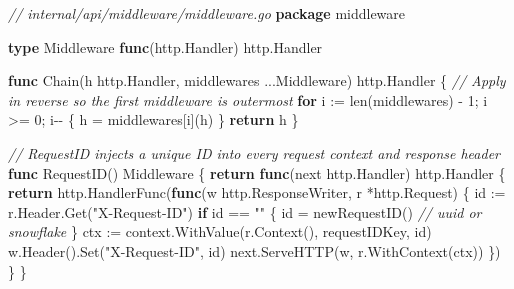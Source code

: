 \documentclass[
]{article}
\newenvironment{Shaded}{}{}
\newcommand{\BuiltInTok}[1]{\textcolor[rgb]{0.00,0.50,0.00}{#1}}
\newcommand{\CommentTok}[1]{\textcolor[rgb]{0.38,0.63,0.69}{\textit{#1}}}
\newcommand{\ControlFlowTok}[1]{\textcolor[rgb]{0.00,0.44,0.13}{\textbf{#1}}}
\newcommand{\DecValTok}[1]{\textcolor[rgb]{0.25,0.63,0.44}{#1}}
\newcommand{\KeywordTok}[1]{\textcolor[rgb]{0.00,0.44,0.13}{\textbf{#1}}}
\newcommand{\NormalTok}[1]{#1}
\newcommand{\OperatorTok}[1]{\textcolor[rgb]{0.40,0.40,0.40}{#1}}
\newcommand{\StringTok}[1]{\textcolor[rgb]{0.25,0.44,0.63}{#1}}
\begin{document}
\begin{Shaded}
\begin{Highlighting}[]
\CommentTok{// internal/api/middleware/middleware.go}
\KeywordTok{package}\NormalTok{ middleware}

\KeywordTok{type}\NormalTok{ Middleware }\KeywordTok{func}\OperatorTok{(}\NormalTok{http}\OperatorTok{.}\NormalTok{Handler}\OperatorTok{)}\NormalTok{ http}\OperatorTok{.}\NormalTok{Handler}

\KeywordTok{func}\NormalTok{ Chain}\OperatorTok{(}\NormalTok{h http}\OperatorTok{.}\NormalTok{Handler}\OperatorTok{,}\NormalTok{ middlewares }\OperatorTok{...}\NormalTok{Middleware}\OperatorTok{)}\NormalTok{ http}\OperatorTok{.}\NormalTok{Handler }\OperatorTok{\{}
    \CommentTok{// Apply in reverse so the first middleware is outermost}
    \ControlFlowTok{for}\NormalTok{ i }\OperatorTok{:=} \BuiltInTok{len}\OperatorTok{(}\NormalTok{middlewares}\OperatorTok{)} \OperatorTok{{-}} \DecValTok{1}\OperatorTok{;}\NormalTok{ i }\OperatorTok{\textgreater{}=} \DecValTok{0}\OperatorTok{;}\NormalTok{ i}\OperatorTok{{-}{-}} \OperatorTok{\{}
\NormalTok{        h }\OperatorTok{=}\NormalTok{ middlewares}\OperatorTok{[}\NormalTok{i}\OperatorTok{](}\NormalTok{h}\OperatorTok{)}
    \OperatorTok{\}}
    \ControlFlowTok{return}\NormalTok{ h}
\OperatorTok{\}}

\CommentTok{// RequestID injects a unique ID into every request context and response header}
\KeywordTok{func}\NormalTok{ RequestID}\OperatorTok{()}\NormalTok{ Middleware }\OperatorTok{\{}
    \ControlFlowTok{return} \KeywordTok{func}\OperatorTok{(}\NormalTok{next http}\OperatorTok{.}\NormalTok{Handler}\OperatorTok{)}\NormalTok{ http}\OperatorTok{.}\NormalTok{Handler }\OperatorTok{\{}
        \ControlFlowTok{return}\NormalTok{ http}\OperatorTok{.}\NormalTok{HandlerFunc}\OperatorTok{(}\KeywordTok{func}\OperatorTok{(}\NormalTok{w http}\OperatorTok{.}\NormalTok{ResponseWriter}\OperatorTok{,}\NormalTok{ r }\OperatorTok{*}\NormalTok{http}\OperatorTok{.}\NormalTok{Request}\OperatorTok{)} \OperatorTok{\{}
\NormalTok{            id }\OperatorTok{:=}\NormalTok{ r}\OperatorTok{.}\NormalTok{Header}\OperatorTok{.}\NormalTok{Get}\OperatorTok{(}\StringTok{"X{-}Request{-}ID"}\OperatorTok{)}
            \ControlFlowTok{if}\NormalTok{ id }\OperatorTok{==} \StringTok{""} \OperatorTok{\{}
\NormalTok{                id }\OperatorTok{=}\NormalTok{ newRequestID}\OperatorTok{()} \CommentTok{// uuid or snowflake}
            \OperatorTok{\}}
\NormalTok{            ctx }\OperatorTok{:=}\NormalTok{ context}\OperatorTok{.}\NormalTok{WithValue}\OperatorTok{(}\NormalTok{r}\OperatorTok{.}\NormalTok{Context}\OperatorTok{(),}\NormalTok{ requestIDKey}\OperatorTok{,}\NormalTok{ id}\OperatorTok{)}
\NormalTok{            w}\OperatorTok{.}\NormalTok{Header}\OperatorTok{().}\NormalTok{Set}\OperatorTok{(}\StringTok{"X{-}Request{-}ID"}\OperatorTok{,}\NormalTok{ id}\OperatorTok{)}
\NormalTok{            next}\OperatorTok{.}\NormalTok{ServeHTTP}\OperatorTok{(}\NormalTok{w}\OperatorTok{,}\NormalTok{ r}\OperatorTok{.}\NormalTok{WithContext}\OperatorTok{(}\NormalTok{ctx}\OperatorTok{))}
        \OperatorTok{\})}
    \OperatorTok{\}}
\OperatorTok{\}}


\end{Highlighting}
\end{Shaded}
\end{document}
